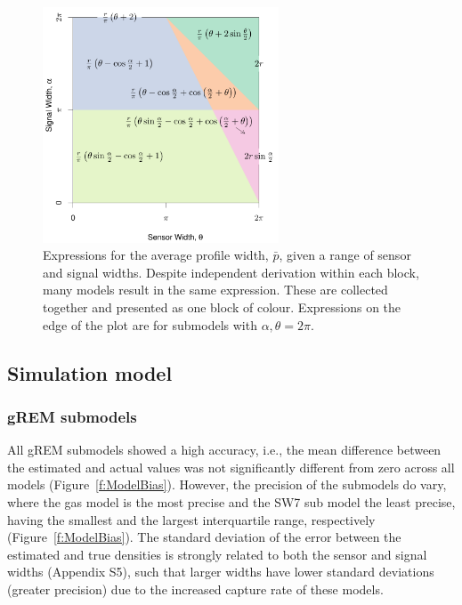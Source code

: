 \documentclass[a4paper,10pt,reqno,oneside]{amsart}
\begin{document}
\begin{figure}
	\centering
	\includegraphics[width=7cm]{imgs/equalModelResults.pdf}
	\caption{Expressions for the average profile width, $\bar{p}$, given a range of sensor and signal widths. Despite independent derivation within each block, many models result in the same expression. These are collected together and presented as one block of colour. Expressions on the edge of the plot are for submodels with $\alpha, \theta = 2\pi$. }
	\label{f:equalModelResults}
\end{figure}



\subsection*{Simulation model}

\subsubsection*{gREM submodels}
All gREM submodels showed a high accuracy, i.e., the mean difference between the estimated and actual values was not significantly different from zero across all models (Figure~\ref{f:ModelBias}). However, the precision of the submodels do vary, where the gas model is the most precise and the SW7 sub model the least precise, having the smallest and the largest interquartile range, respectively (Figure~\ref{f:ModelBias}). The standard deviation of the error between the estimated and true densities is strongly related to both the sensor and signal widths (Appendix S5), such that larger widths have lower standard deviations (greater precision) due to the increased capture rate of these models.
\end{document}
